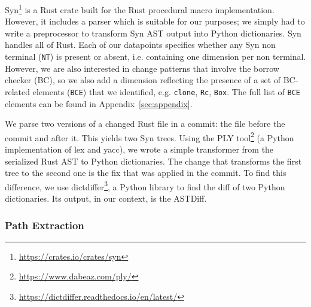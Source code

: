 Syn\footnote{\url{https://crates.io/crates/syn}} is a Rust crate built for the Rust procedural macro implementation. However, it includes a parser which is suitable for our purposes; we simply had to write a preprocessor to transform Syn AST output into Python dictionaries. Syn handles all of Rust. Each of our datapoints specifies whether any Syn non terminal (\texttt{NT}) is present or absent, i.e. containing one dimension per non terminal. However, we are also interested in change patterns that involve the borrow checker (BC), so we also add a dimension reflecting the presence of a set of BC-related elements (\texttt{BCE}) that we identified, e.g. \texttt{clone}, \texttt{Rc}, \texttt{Box}. The full list of \texttt{BCE} elements can be found in Appendix~\ref{sec:appendix}.

We parse two versions of a changed Rust file in a commit: the file before the commit and after it. This yields two Syn trees. Using the PLY tool\footnote{\url{https://www.dabeaz.com/ply/}} (a Python implementation of lex and yacc), we wrote a simple transformer from the serialized Rust AST to Python dictionaries. The change that transforms the first tree to the second one is the fix that was applied in the commit. To find this difference, we use dictdiffer\footnote{\url{https://dictdiffer.readthedocs.io/en/latest/}}, a Python library to find the diff of two Python dictionaries. Its output, in our context, is the ASTDiff.

\subsubsection{\label{sec:path_extraction}Path Extraction}



